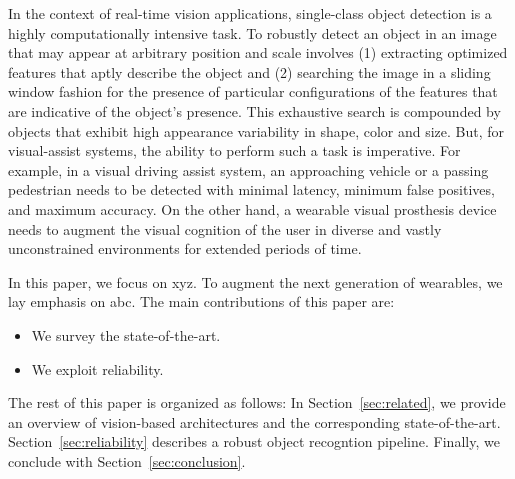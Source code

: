 In the context of real-time vision applications, single-class object detection is a highly computationally intensive task.  
To robustly detect an object
in an image that may appear at arbitrary position and scale involves (1) extracting optimized features that aptly describe the object and (2) 
searching the image in a sliding window fashion for the presence of particular configurations of the features that are indicative of the object's presence. 
This exhaustive search is compounded by objects that exhibit high appearance variability in shape, color and size. 
But, for visual-assist systems, the ability to perform such a task is imperative. For example, in a visual driving
assist system, an approaching vehicle or a passing pedestrian needs to be detected
with minimal latency, minimum false positives, and maximum accuracy. On the other hand, a wearable visual prosthesis device needs to augment the visual cognition of the user 
in diverse and vastly unconstrained environments for extended periods of time.

In this paper, we focus on xyz.
To augment the next generation of wearables, we lay emphasis on abc.
The main contributions of this paper are:
\begin{itemize}
\item We survey the state-of-the-art. 
\item We exploit reliability. 
\end{itemize}

The rest of this paper is organized as follows:
In Section~\ref{sec:related}, we provide an overview of vision-based architectures and the corresponding state-of-the-art.
Section~\ref{sec:reliability} describes a robust object recogntion pipeline.
Finally, we conclude with Section~\ref{sec:conclusion}.


